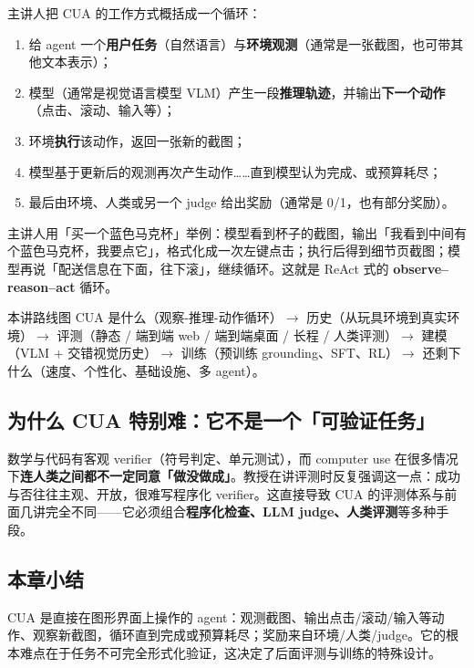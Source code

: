 ﻿\documentclass[a4paper]{article}
\begin{document}
主讲人把 CUA 的工作方式概括成一个循环：

\begin{enumerate}
\item 给 agent 一个\textbf{用户任务}（自然语言）与\textbf{环境观测}（通常是一张截图，也可带其他文本表示）；
\item 模型（通常是视觉语言模型 VLM）产生一段\textbf{推理轨迹}，并输出\textbf{下一个动作}（点击、滚动、输入等）；
\item 环境\textbf{执行}该动作，返回一张新的截图；
\item 模型基于更新后的观测再次产生动作……直到模型认为完成、或预算耗尽；
\item 最后由环境、人类或另一个 judge 给出奖励（通常是 0/1，也有部分奖励）。
\end{enumerate}

主讲人用「买一个蓝色马克杯」举例：模型看到杯子的截图，输出「我看到中间有个蓝色马克杯，我要点它」，格式化成一次左键点击；执行后得到细节页截图；模型再说「配送信息在下面，往下滚」，继续循环。这就是 ReAct 式的 \textbf{observe--reason--act} 循环。

\begin{knowledgebox}{本讲路线图}
CUA 是什么（观察-推理-动作循环）$\rightarrow$ 历史（从玩具环境到真实环境）$\rightarrow$ 评测（静态 / 端到端 web / 端到端桌面 / 长程 / 人类评测）$\rightarrow$ 建模（VLM + 交错视觉历史）$\rightarrow$ 训练（预训练 grounding、SFT、RL）$\rightarrow$ 还剩下什么（速度、个性化、基础设施、多 agent）。
\end{knowledgebox}

\subsection{为什么 CUA 特别难：它不是一个「可验证任务」}

数学与代码有客观 verifier（符号判定、单元测试），而 computer use 在很多情况下\textbf{连人类之间都不一定同意「做没做成」}。教授在讲评测时反复强调这一点：成功与否往往主观、开放，很难写程序化 verifier。这直接导致 CUA 的评测体系与前面几讲完全不同——它必须组合\textbf{程序化检查、LLM judge、人类评测}等多种手段。

\subsection{本章小结}
CUA 是直接在图形界面上操作的 agent：观测截图、输出点击/滚动/输入等动作、观察新截图，循环直到完成或预算耗尽；奖励来自环境/人类/judge。它的根本难点在于任务不可完全形式化验证，这决定了后面评测与训练的特殊设计。
\end{document}

